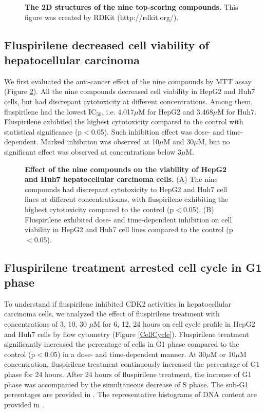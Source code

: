 \documentclass[10pt,letterpaper]{article}
\begin{document}
\begin{figure}%
\caption{{\bf The 2D structures of the nine top-scoring compounds.} This figure was created by RDKit (http://rdkit.org/). }
\label{Top9Structures}
\end{figure}

\subsection*{Fluspirilene decreased cell viability of hepatocellular carcinoma}

We first evaluated the anti-cancer effect of the nine compounds by MTT assay (Figure \ref{CellViability}). All the nine compounds decreased cell viability in HepG2 and Huh7 cells, but had discrepant cytotoxicity at different concentrations. Among them, fluspirilene had the lowest IC$_{50}$, i.e. 4.017$\mu$M for HepG2 and 3.468$\mu$M for Huh7. Fluspirilene exhibited the highest cytotoxicity compared to the control with statistical significance (p$<$0.05). Such inhibition effect was dose- and time-dependent. Marked inhibition was observed at 10$\mu$M and 30$\mu$M, but no significant effect was observed at concentrations below 3$\mu$M.

\begin{figure}%
\caption{{\bf Effect of the nine compounds on the viability of HepG2 and Huh7 hepatocellular carcinoma cells.} (A) The nine compounds had discrepant cytotoxicity to HepG2 and Huh7 cell lines at different concentrationas, with fluspirilene exhibiting the highest cytotoxicity compared to the control (p$<$0.05). (B) Fluspirilene exhibited dose- and time-dependent inhibition on cell viability in HepG2 and Huh7 cell lines compared to the control (p$<$0.05).}
\label{CellViability}
\end{figure}

\subsection*{Fluspirilene treatment arrested cell cycle in G1 phase}

To understand if fluspirilene inhibited CDK2 activities in hepatocellular carcinoma cells, we analyzed the effect of fluspirilene treatment with concentrations of 3, 10, 30 $\mu$M for 6, 12, 24 hours on cell cycle profile in HepG2 and Huh7 cells by flow cytometry (Figure \ref{CellCycle}). Fluspirilene treatment significantly increased the percentage of cells in G1 phase compared to the control (p$<$0.05) in a dose- and time-dependent manner. At 30$\mu$M or 10$\mu$M concentration, fluspirilene treatment continuously increased the percentage of G1 phase for 24 hours. After 24 hours of fluspirilene treatment, the increase of G1 phase was accompanied by the simultaneous decrease of S phase. The sub-G1 percentages are provided in . The representative histograms of DNA content are provided in .
\end{document}
